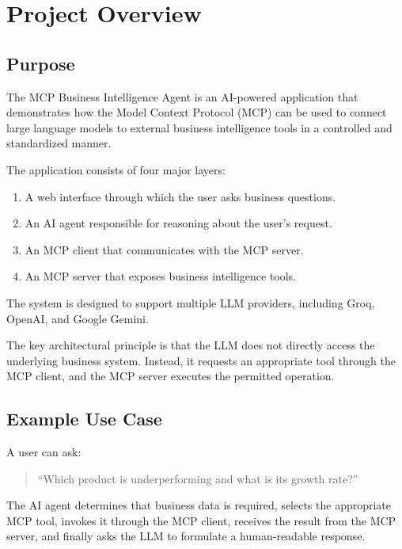\documentclass[11pt,a4paper]{article}
\begin{document}
\section{Project Overview}

\subsection{Purpose}

The MCP Business Intelligence Agent is an AI-powered application that
demonstrates how the Model Context Protocol (MCP) can be used to connect
large language models to external business intelligence tools in a
controlled and standardized manner.

The application consists of four major layers:

\begin{enumerate}
\item A web interface through which the user asks business questions.
\item An AI agent responsible for reasoning about the user's request.
\item An MCP client that communicates with the MCP server.
\item An MCP server that exposes business intelligence tools.
\end{enumerate}

The system is designed to support multiple LLM providers, including
Groq, OpenAI, and Google Gemini.

The key architectural principle is that the LLM does not directly access
the underlying business system. Instead, it requests an appropriate
tool through the MCP client, and the MCP server executes the permitted
operation.

\subsection{Example Use Case}

A user can ask:

\begin{quote}
``Which product is underperforming and what is its growth rate?''
\end{quote}

The AI agent determines that business data is required, selects the
appropriate MCP tool, invokes it through the MCP client, receives the
result from the MCP server, and finally asks the LLM to formulate a
human-readable response.
\end{document}
